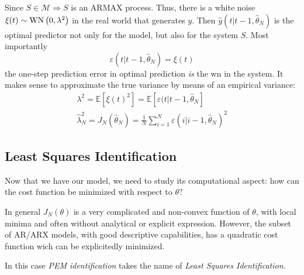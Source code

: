 Since $ S\in \mathcal{M} \Longrightarrow S$ is an ARMAX process. Thus, there is a white noise $ \xi (t) \sim \operatorname{WN}\left(0,\lambda ^{2}\right)$ in the real world that generates $ y$. Then $ \hat{y}(t|t-1,\hat{\theta }_{N})$ is the optimal predictor not only for the model, but also for the system $ S$. Most importantly
\begin{equation*}
\varepsilon (t|t-1,\hat{\theta }_{N}) =\xi (t)
\end{equation*}
the one-step prediction error in optimal prediction \textit{is} the \gls{wn} in the system. It makes sense to approximate the true variance by means of an empirical variance:
\begin{gather*}
\lambda ^{2} =\mathbb{E}\left[ \xi (t)^{2}\right] =\mathbb{E}[ \varepsilon (t|t-1,\hat{\theta }_{N}]\\
\hat{\lambda }_{N}^{2} =J_{N}(\hat{\theta }_{N}) =\frac{1}{N}\sum _{i=1}^{N} \varepsilon (i|i-1,\hat{\theta }_{N})^{2}
\end{gather*}

\subsection{Least Squares Identification}
Now that we have our model, we need to study its computational aspect: how can the cost function be minimized with respect to $ \theta ?$

In general $ J_{N}(\theta)$ is a very complicated and non-convex function of $ \theta $, with local minima and often without analytical or explicit expression. However, the subset of AR/ARX models, with good descriptive capabilities, has a quadratic cost function wich can be explicitedly minimized.

In this case \textit{PEM identification} takes the name of \textit{Least Squares Identification. }

